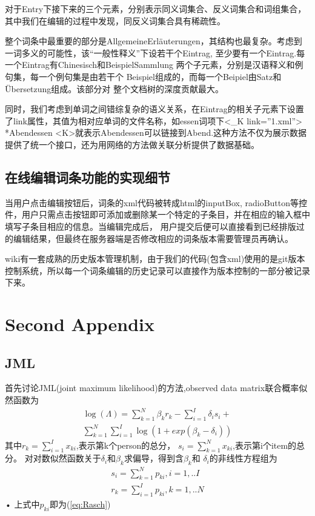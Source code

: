 \documentclass[12pt]{article}
\begin{document}
对于Entry下接下来的三个元素，分别表示同义词集合、反义词集合和词组集合，其中我们在编辑的过程中发现，同反义词集合具有稀疏性。

整个词条中最重要的部分是AllgemeineErläuterungen，其结构也最复杂。考虑到一词多义的可能性，该“一般性释义”下设若干个Eintrag,
至少要有一个Eintrag.每一个Eintrag有Chinesisch和BeispielSammlung
两个子元素，分别是汉语释义和例句集，每一个例句集是由若干个
Beispiel组成的，而每一个Beipiel由Satz和Übersetzung组成。该部分对
整个文档树的深度贡献最大。

同时，我们考虑到单词之间错综复杂的语义关系，在Eintrag的相关子元素下设置了link属性，其值为相对应单词的文件名称，如essen词项下<\_K link=''1.xml''> \\*Abendessen 
<\/K>就表示Abendessen可以链接到Abend.这种方法不仅为展示数据提供了统一个接口，还为用网络的方法做关联分析提供了数据基础。
\subsection{在线编辑词条功能的实现细节}\label{A_F_2}
当用户点击编辑按钮后，词条的xml代码被转成html的inputBox, radioButton等控件，用户只需点击按钮即可添加或删除某一个特定的子条目，并在相应的输入框中填写子条目相应的信息。当编辑完成后，
用户提交后便可以直接看到已经排版过的编辑结果，但最终在服务器端是否修改相应的词条版本需要管理员再确认。

wiki有一套成熟的历史版本管理机制，由于我们的代码(包含xml)使用的是git版本控制系统，所以每一个词条编辑的历史记录可以直接作为版本控制的一部分被记录下来。

\section{Second Appendix}
\subsection{JML}\label{A1}
首先讨论JML(joint maximum likelihood)的方法,observed data matrix联合概率似然函数为
\begin{equation}
\begin{split}
\log(\Lambda)=\sum_{k=1}^N \beta_k r_k -\sum_{i=1}^I \delta_i s_i+ \\
\sum_{k=1}^N \sum_{i=1}^I \log(1+exp(\beta_k-\delta_i))
\end{split}
\end{equation}
其中$r_k=\displaystyle\sum_{i=1}^I x_{ki}$,表示第k个person的总分，
$s_i=\displaystyle\sum_{k=1}^N x_{ki}$,表示第i个item的总分。
对对数似然函数关于$\delta_i$和$\beta_k$求偏导，得到含$\beta_k$和
$\delta_i$的非线性方程组为
\begin{eqnarray}\label{eq:JML}
s_i=\sum_{k=1}^N p_{ki},i=1,..I\\
r_k=\sum_{i=1}^I p_{ki},k=1,..N
\end{eqnarray}•
上式中$p_{ki}$即为(\ref{eq:Rasch})
\end{document}
